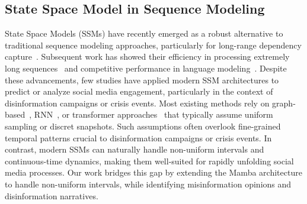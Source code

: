 \subsection{State Space Model in Sequence Modeling}
State Space Models (SSMs) have recently emerged as a robust alternative to traditional sequence modeling approaches, particularly for long-range dependency capture~\citep{hasani2021liquid,rangapuram2018deep}. Subsequent work has showed their efficiency in processing extremely long sequences~\citep{gu2022efficiently,dao2022flashattention} and competitive performance in language modeling~\citep{mamba,mamba2}.
Despite these advancements, few studies have applied modern SSM architectures to predict or analyze social media engagement, particularly in the context of disinformation campaigns or crisis events. 
Most existing methods rely on graph-based~\citep{lu2023continuous}, RNN~\citep{wang2017cascade}, or transformer approaches~\citep{zuo2020transformer} that typically assume uniform sampling or discret snapshots. Such assumptions often overlook fine-grained temporal patterns crucial to disinformation campaigns or crisis events.
In contrast, modern SSMs can naturally handle non-uniform intervals and continuous-time dynamics, making them well-suited for rapidly unfolding social media processes. 
Our work bridges this gap by extending the Mamba architecture to handle non-uniform intervals, while identifying misinformation opinions and disinformation narratives.





